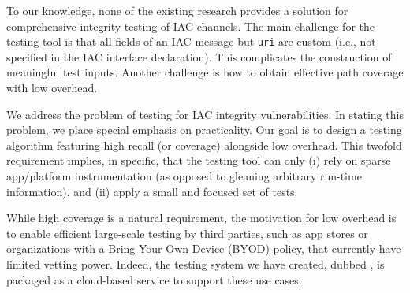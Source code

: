 To our knowledge, none of the existing research provides a solution for comprehensive integrity testing of IAC channels. The main challenge for the testing tool is that all fields of an IAC message but {\tt uri} are custom (i.e., not specified in the IAC interface declaration). This complicates the construction of meaningful test inputs. Another challenge is how to obtain effective path coverage with low overhead.

%

 We address the problem of testing for IAC integrity vulnerabilities. In stating this problem, we place special emphasis on practicality. Our goal is to design a testing algorithm featuring high recall (or coverage) alongside low overhead. This twofold requirement implies, in specific, that the testing tool can only (i) rely on sparse app/platform instrumentation (as opposed to gleaning arbitrary run-time information), and (ii) apply a small and focused set of tests.

While high coverage is a natural requirement, the motivation for low overhead is to enable efficient large-scale testing by third parties, such as app stores or organizations with a Bring Your Own Device (BYOD) policy, that currently have limited vetting power. Indeed, the testing system we have created, dubbed \Tool, is packaged as a cloud-based service to support these use cases.

